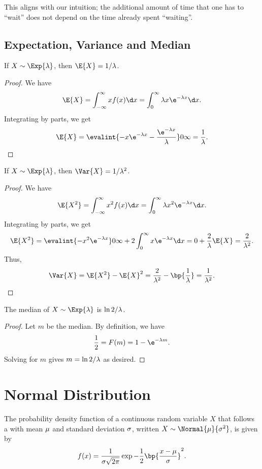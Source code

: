 This aligns with our intuition; the additional amount of time that one has to ``wait'' does not depend on the time already spent ``waiting''.

\subsection{Expectation, Variance and Median}

\begin{proposition}
    If $X \sim \Exp{\l}$, then $\E{X} = 1/\l$.
\end{proposition}
\begin{proof}
    We have \[\E{X} = \int_{-\infty}^\infty x f(x) \d x = \int_0^\infty \l x \e^{-\l x} \d x.\] Integrating by parts, we get \[\E{X} = \evalint{-x\e^{-\l x} - \frac{\e^{-\l x}}{\l}}0\infty = \frac1\l.\]
\end{proof}

\begin{proposition}
    If $X \sim \Exp{\l}$, then $\Var{X} = 1/\l^2$.
\end{proposition}
\begin{proof}
    We have \[\E{X^2} = \int_{-\infty}^\infty x^2 f(x) \d x = \int_0^\infty \l x^2 \e^{-\l x} \d x.\] Integrating by parts, we get \[\E{X^2} = \evalint{-x^2 \e^{-\l x}}0\infty + 2\int_0^\infty x \e^{-\l x} \d x = 0 + \frac2\l \E{X} = \frac2{\l^2}.\] Thus, \[\Var{X} = \E{X^2} - \E{X}^2 = \frac{2}{\l^2} - \bp{\frac1\l} = \frac1{\l^2}.\]
\end{proof}

\begin{proposition}
    The median of $X \sim \Exp{\l}$ is $\ln{2}/\lambda$.
\end{proposition}
\begin{proof}
    Let $m$ be the median. By definition, we have \[\frac12 = F(m) = 1 - \e^{-\l m}.\] Solving for $m$ gives $m = \ln{2}/\lambda$ as desired.
\end{proof}

\section{Normal Distribution}

\begin{definition}
    The probability density function of a continuous random variable $X$ that follows a  with mean $\mu$ and standard deviation $\sigma$, written $X \sim \Normal{\m}{\s^2}$, is given by \[f(x) = \frac1{\s \sqrt{2\pi}} \exp{-\frac12 \bp{\frac{x-\m}{\s}}^2}.\]
\end{definition}

